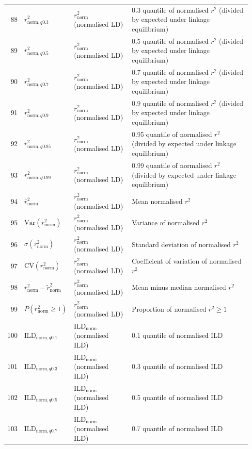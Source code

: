 \begin{longtable}{@{}rllp{7.5cm}@{}}
88 & $r^2_{\mathrm{norm},q0.3}$ & $r^2_\mathrm{norm}$ (normalised LD) & 0.3 quantile of normalised $r^2$ (divided by expected under linkage equilibrium) \\
89 & $r^2_{\mathrm{norm},q0.5}$ & $r^2_\mathrm{norm}$ (normalised LD) & 0.5 quantile of normalised $r^2$ (divided by expected under linkage equilibrium) \\
90 & $r^2_{\mathrm{norm},q0.7}$ & $r^2_\mathrm{norm}$ (normalised LD) & 0.7 quantile of normalised $r^2$ (divided by expected under linkage equilibrium) \\
91 & $r^2_{\mathrm{norm},q0.9}$ & $r^2_\mathrm{norm}$ (normalised LD) & 0.9 quantile of normalised $r^2$ (divided by expected under linkage equilibrium) \\
92 & $r^2_{\mathrm{norm},q0.95}$ & $r^2_\mathrm{norm}$ (normalised LD) & 0.95 quantile of normalised $r^2$ (divided by expected under linkage equilibrium) \\
93 & $r^2_{\mathrm{norm},q0.99}$ & $r^2_\mathrm{norm}$ (normalised LD) & 0.99 quantile of normalised $r^2$ (divided by expected under linkage equilibrium) \\
94 & $\bar{r}^2_\mathrm{norm}$ & $r^2_\mathrm{norm}$ (normalised LD) & Mean normalised $r^2$ \\
95 & $\mathrm{Var}(r^2_\mathrm{norm})$ & $r^2_\mathrm{norm}$ (normalised LD) & Variance of normalised $r^2$ \\
96 & $\sigma(r^2_\mathrm{norm})$ & $r^2_\mathrm{norm}$ (normalised LD) & Standard deviation of normalised $r^2$ \\
97 & $\mathrm{CV}(r^2_\mathrm{norm})$ & $r^2_\mathrm{norm}$ (normalised LD) & Coefficient of variation of normalised $r^2$ \\
98 & $\bar{r}^2_\mathrm{norm} - \tilde{r}^2_\mathrm{norm}$ & $r^2_\mathrm{norm}$ (normalised LD) & Mean minus median normalised $r^2$ \\
99 & $P(r^2_\mathrm{norm} \geq 1)$ & $r^2_\mathrm{norm}$ (normalised LD) & Proportion of normalised $r^2 \geq 1$ \\
\midrule
100 & ILD$_{\mathrm{norm},q0.1}$ & ILD$_\mathrm{norm}$ (normalised ILD) & 0.1 quantile of normalised ILD \\
101 & ILD$_{\mathrm{norm},q0.3}$ & ILD$_\mathrm{norm}$ (normalised ILD) & 0.3 quantile of normalised ILD \\
102 & ILD$_{\mathrm{norm},q0.5}$ & ILD$_\mathrm{norm}$ (normalised ILD) & 0.5 quantile of normalised ILD \\
103 & ILD$_{\mathrm{norm},q0.7}$ & ILD$_\mathrm{norm}$ (normalised ILD) & 0.7 quantile of normalised ILD \\

\end{longtable}
